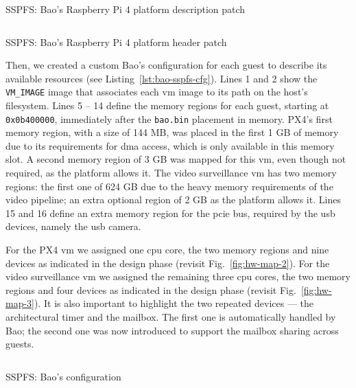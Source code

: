\begin{longlisting}
\centering
\inputminted[]{c}{./listing/rpi4_desc.c}
\caption{SSPFS: Bao's Raspberry Pi 4 platform description patch}
\label{lst:rpi4-desc}
\end{longlisting}

\begin{longlisting}
\centering
\inputminted[]{c}{./listing/platform.h}
\caption{SSPFS: Bao's Raspberry Pi 4 platform header patch}
\label{lst:rpi4-plat-header}
\end{longlisting}

Then, we created a custom Bao's configuration for each guest to describe its
available resources (see Listing~\ref{lst:bao-sspfs-cfg}). Lines 1 and 2 show the
\lstinline{VM_IMAGE} image that associates each \gls{vm} image to its path on
the host's filesystem. Lines 5 -- 14 define the memory regions for each guest,
starting at \lstinline{0x0b400000}, immediately after the \texttt{bao.bin}
placement in memory. PX4's first memory region, with a size of 144 MB, was placed in the first 1 GB of
memory due to its requirements for \gls{dma} access, which is only available in
this memory slot. A second memory region of 3 GB was mapped for this \gls{vm},
even though not required, as the platform allows it. The video surveillance
\gls{vm} has two memory regions: the first one of 624 GB due to the heavy memory
requirements of the video pipeline; an extra optional region of 2 GB as the
platform allows it. Lines 15 and 16 define an extra memory region for the
\gls{pcie} bus, required by the \gls{usb} devices, namely the \gls{usb} camera.

For the PX4 \gls{vm} we assigned one \gls{cpu} core, the two memory regions and
nine devices as indicated in the design phase (revisit
Fig.~\ref{fig:hw-map-2}). For the video surveillance \gls{vm} we assigned the
remaining three \gls{cpu} cores, the two memory regions and four devices as
indicated in the design phase (revisit Fig.~\ref{fig:hw-map-3}). It is also
important to highlight the two repeated devices --- the architectural timer and
the mailbox. The first one is automatically handled by Bao; the second one was
now introduced to support the mailbox sharing across guests.

\begin{longlisting}
\centering
\inputminted[]{c}{./listing/bao-sspfs-cfg.c}
\caption{SSPFS: Bao's configuration}
\label{lst:bao-sspfs-cfg}
\end{longlisting}

